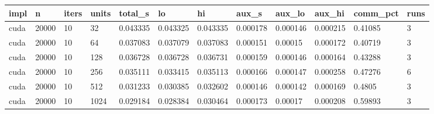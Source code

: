 \begin{tabular}{llllllllllll}
\hline
impl & n & iters & units & total\_s & lo & hi & aux\_s & aux\_lo & aux\_hi & comm\_pct & runs \\
\hline
cuda & 20000 & 10 & 32 & 0.043335 & 0.043325 & 0.043335 & 0.000178 & 0.000146 & 0.000215 & 0.41085 & 3 \\
cuda & 20000 & 10 & 64 & 0.037083 & 0.037079 & 0.037083 & 0.000151 & 0.00015 & 0.000172 & 0.40719 & 3 \\
cuda & 20000 & 10 & 128 & 0.036728 & 0.036728 & 0.036731 & 0.000159 & 0.000146 & 0.000164 & 0.43288 & 3 \\
cuda & 20000 & 10 & 256 & 0.035111 & 0.033415 & 0.035113 & 0.000166 & 0.000147 & 0.000258 & 0.47276 & 6 \\
cuda & 20000 & 10 & 512 & 0.031233 & 0.030385 & 0.032602 & 0.000146 & 0.000142 & 0.000169 & 0.4805 & 3 \\
cuda & 20000 & 10 & 1024 & 0.029184 & 0.028384 & 0.030464 & 0.000173 & 0.00017 & 0.000208 & 0.59893 & 3 \\
\hline
\end{tabular}
